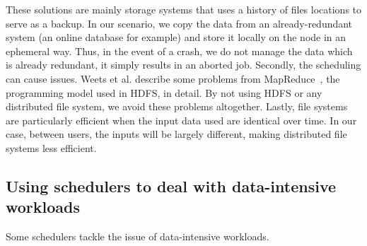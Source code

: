\documentclass[conference,10pt]{IEEEtran}
\begin{document}
These solutions are mainly storage systems that uses a history of files locations to serve as a backup.
In our scenario, we copy the data from an already-redundant system (an online database for example)
and store it locally on the node in an ephemeral way.
Thus, in the event of a crash, we do not manage the data which is already redundant, it simply results in an aborted job.
Secondly, the scheduling can cause issues. Weets et al. describe some problems from
MapReduce~\cite{issue_with_hdfs}, the programming model used in HDFS, in detail.
By not using HDFS or any distributed file system, we avoid these problems altogether. 
Lastly, file systems are particularly efficient when the input data used are identical over time.
In our case, between users, the inputs will be largely different, making distributed file systems less efficient.




\subsection{Using schedulers to deal with data-intensive workloads}

Some schedulers tackle the issue of data-intensive workloads.
\end{document}
